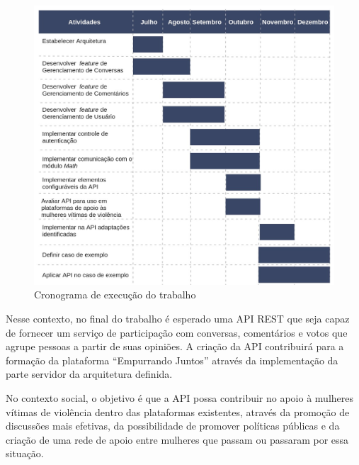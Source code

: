 \begin{figure}[ht!]
\centering
\includegraphics[scale=0.45]{figuras/cronograma.jpg}
\caption{Cronograma de execução do trabalho}
\label{fig:planejamento}
\end{figure}

Nesse contexto, no final do trabalho é esperado uma API REST que seja capaz de fornecer um serviço de participação com conversas, comentários
e votos que agrupe pessoas a partir de suas opiniões. A criação da API contribuirá para a formação da plataforma ``Empurrando Juntos'' 
através da implementação da parte servidor da arquitetura definida.

No contexto social, o objetivo é que a API possa contribuir no apoio à mulheres vítimas de violência dentro das plataformas existentes, através
da promoção de discussões mais efetivas, da possibilidade de promover políticas públicas e da criação de uma rede de apoio entre mulheres que passam ou passaram por essa situação.
